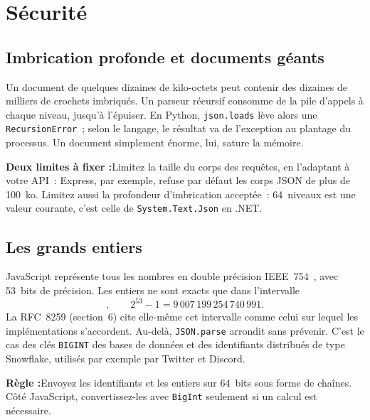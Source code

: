 \documentclass[12pt,a4paper]{article}
\newcommand{\takeaway}[2]{%
  \vspace{10pt}%
  \noindent\colorbox{primary!7}{%
    \parbox{\dimexpr\textwidth-2\fboxsep\relax}{%
      \vspace{4pt}\textbf{\color{primary}#1 :}\hspace{0.5em}\color{darkgray}#2\vspace{4pt}%
    }%
  }%
  \vspace{10pt}%
}
\newcommand{\warningbox}[2]{%
  \vspace{10pt}%
  \noindent\colorbox{accent!10}{%
    \parbox{\dimexpr\textwidth-2\fboxsep\relax}{%
      \vspace{4pt}\textbf{\color{accent}#1 :}\hspace{0.5em}\color{darkgray}#2\vspace{4pt}%
    }%
  }%
  \vspace{10pt}%
}
\newcommand{\exemple}[3][]{%
  \par\addvspace{6pt}\noindent\begin{minipage}{\linewidth}%
  \end{minipage}\par\addvspace{6pt}}
\begin{document}
\section{Sécurité}
\label{sec:securite}

\subsection{Imbrication profonde et documents géants}
Un document de quelques dizaines de kilo-octets peut contenir des dizaines de milliers de crochets imbriqués. Un parseur récursif consomme de la pile d'appels à chaque niveau, jusqu'à l'épuiser. En Python, \texttt{json.loads} lève alors une \texttt{RecursionError}~; selon le langage, le résultat va de l'exception au plantage du processus. Un document simplement énorme, lui, sature la mémoire.

\warningbox{Deux limites à fixer}{Limitez la taille du corps des requêtes, en l'adaptant à votre API~: Express, par exemple, refuse par défaut les corps JSON de plus de 100~ko. Limitez aussi la profondeur d'imbrication acceptée~: 64~niveaux est une valeur courante, c'est celle de \texttt{System.Text.Json} en .NET.}

\subsection{Les grands entiers}
\label{sec:precision}
JavaScript représente tous les nombres en double précision IEEE~754~\cite{ieee754}, avec 53~bits de précision. Les entiers ne sont exacts que dans l'intervalle
\begin{equation}
[-(2^{53}-1),\; 2^{53}-1], \qquad 2^{53}-1 = 9\,007\,199\,254\,740\,991.
\end{equation}
La RFC~8259 (section~6) cite elle-même cet intervalle comme celui sur lequel les implémentations s'accordent. Au-delà, \texttt{JSON.parse} arrondit sans prévenir. C'est le cas des clés \texttt{BIGINT} des bases de données et des identifiants distribués de type Snowflake, utilisés par exemple par Twitter et Discord.

\exemple[language=javascript]{js/11_precision.mjs}{Un identifiant faussé par \texttt{JSON.parse}}

\takeaway{Règle}{Envoyez les identifiants et les entiers sur 64~bits sous forme de chaînes. Côté JavaScript, convertissez-les avec \texttt{BigInt} seulement si un calcul est nécessaire.}
\end{document}
